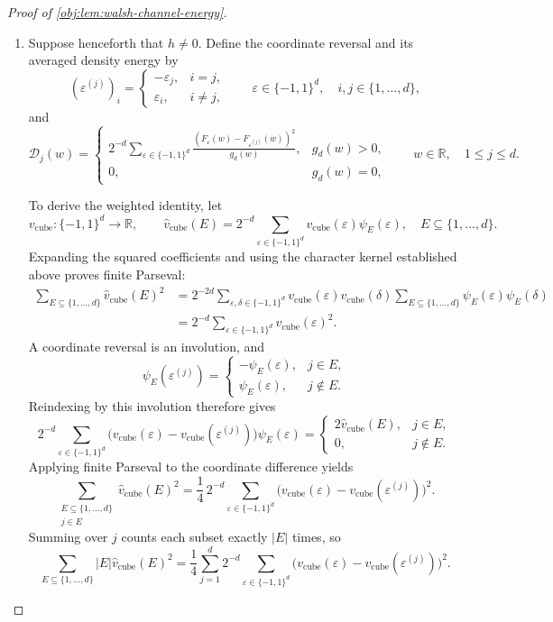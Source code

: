 \documentclass[11pt]{article}
\begin{document}
\begin{proof}[Proof of \cref{obj:lem:walsh-channel-energy}]
\begin{enumerate}
\item Suppose henceforth that \(h\ne0\). Define the coordinate reversal and its averaged density energy by
\[
(\varepsilon^{(j)})_i=
\begin{cases}
-\varepsilon_j,&i=j,\\
\varepsilon_i,&i\ne j,
\end{cases}
\qquad
\varepsilon\in\{-1,1\}^d,\quad i,j\in\{1,\ldots,d\},
\]
and
\[
\mathcal D_j(w)=
\begin{cases}
2^{-d}\displaystyle\sum_{\varepsilon\in\{-1,1\}^d}
\frac{(F_\varepsilon(w)-F_{\varepsilon^{(j)}}(w))^2}{g_d(w)},
&g_d(w)>0,\\
0,&g_d(w)=0,
\end{cases}
\qquad w\in\mathbb R,\quad 1\le j\le d.
\]

To derive the weighted identity, let
\[
v_{\mathrm{cube}}:\{-1,1\}^d\longrightarrow\mathbb R,
\qquad
\widehat v_{\mathrm{cube}}(E)
=
2^{-d}\sum_{\varepsilon\in\{-1,1\}^d}
v_{\mathrm{cube}}(\varepsilon)\psi_E(\varepsilon),
\quad E\subseteq\{1,\ldots,d\}.
\]
Expanding the squared coefficients and using the character kernel established above proves finite Parseval:
\[
\begin{aligned}
\sum_{E\subseteq\{1,\ldots,d\}}
\widehat v_{\mathrm{cube}}(E)^2
&=
2^{-2d}\sum_{\varepsilon,\delta\in\{-1,1\}^d}
v_{\mathrm{cube}}(\varepsilon)v_{\mathrm{cube}}(\delta)
\sum_{E\subseteq\{1,\ldots,d\}}
\psi_E(\varepsilon)\psi_E(\delta)\\
&=
2^{-d}\sum_{\varepsilon\in\{-1,1\}^d}
v_{\mathrm{cube}}(\varepsilon)^2.
\end{aligned}
\]
A coordinate reversal is an involution, and
\[
\psi_E(\varepsilon^{(j)})
=
\begin{cases}
-\psi_E(\varepsilon),&j\in E,\\
\psi_E(\varepsilon),&j\notin E.
\end{cases}
\]
Reindexing by this involution therefore gives
\[
2^{-d}\sum_{\varepsilon\in\{-1,1\}^d}
\bigl(v_{\mathrm{cube}}(\varepsilon)
-v_{\mathrm{cube}}(\varepsilon^{(j)})\bigr)\psi_E(\varepsilon)
=
\begin{cases}
2\widehat v_{\mathrm{cube}}(E),&j\in E,\\
0,&j\notin E.
\end{cases}
\]
Applying finite Parseval to the coordinate difference yields
\[
\sum_{\substack{E\subseteq\{1,\ldots,d\}\\j\in E}}
\widehat v_{\mathrm{cube}}(E)^2
=
\frac14\,2^{-d}\sum_{\varepsilon\in\{-1,1\}^d}
\bigl(v_{\mathrm{cube}}(\varepsilon)
-v_{\mathrm{cube}}(\varepsilon^{(j)})\bigr)^2.
\]
Summing over \(j\) counts each subset exactly \(|E|\) times, so
\[
\sum_{E\subseteq\{1,\ldots,d\}}
|E|\widehat v_{\mathrm{cube}}(E)^2
=
\frac14\sum_{j=1}^d2^{-d}
\sum_{\varepsilon\in\{-1,1\}^d}
\bigl(v_{\mathrm{cube}}(\varepsilon)
-v_{\mathrm{cube}}(\varepsilon^{(j)})\bigr)^2.
\]


\end{enumerate}
\end{proof}
\end{document}
